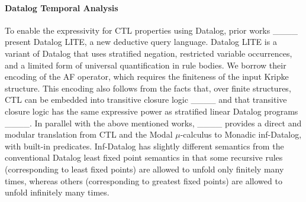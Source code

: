 








\vspace{-1mm}
\noindent\paragraph{\textbf{Datalog Temporal Analysis}}

To enable the expressivity for CTL properties using Datalog, prior works ____
present Datalog LITE, a new deductive query language. Datalog LITE is a variant of Datalog that uses stratified negation, restricted variable occurrences, and a limited form of universal quantification in rule bodies. 
We borrow their encoding of the AF operator, 
which requires the finiteness of the input Kripke structure. 
This encoding also follows from the facts that, over finite structures, CTL can be embedded into transitive closure logic ____ and that transitive closure logic has the same expressive power as stratified linear Datalog programs ____. 
In parallel with the above mentioned works, ____
provides a direct and modular translation from CTL and the Modal $\mu$-calculus to Monadic inf-Datalog, with built-in predicates. Inf-Datalog has slightly different semantics from the conventional Datalog least fixed point semantics in that some recursive rules (corresponding to least fixed points) are allowed to unfold only finitely many times, whereas others (corresponding to greatest fixed points) are allowed to unfold infinitely many times. 





